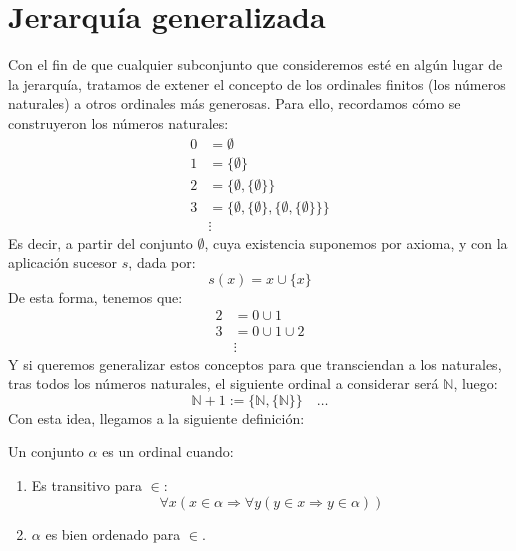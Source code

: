 \section{Jerarquía generalizada}
Con el fin de que cualquier subconjunto que consideremos esté en algún lugar de la jerarquía, tratamos de extener el concepto de los ordinales finitos (los números naturales) a otros ordinales más generosas. Para ello, recordamos cómo se construyeron los números naturales:
\begin{align*}
    0 &= \emptyset  \\
    1 &= \{\emptyset \} \\
    2 &= \{\emptyset , \{\emptyset \}\} \\
    3 &= \{\emptyset , \{\emptyset \}, \{\emptyset , \{\emptyset \}\}\} \\
      &\vdots
\end{align*}
Es decir, a partir del conjunto $\emptyset $, cuya existencia suponemos por axioma, y con la aplicación sucesor $s$, dada por:
\begin{equation*}
    s(x) = x\cup \{x\}
\end{equation*}
De esta forma, tenemos que:
\begin{align*}
    2 &= 0 \cup 1 \\
    3 &= 0 \cup 1 \cup 2 \\
      &\vdots
\end{align*}
Y si queremos generalizar estos conceptos para que transciendan a los naturales, tras todos los números naturales, el siguiente ordinal a considerar será $\mathbb{N}$, luego:
\begin{equation*}
    \mathbb{N}+1 := \{\mathbb{N}, \{\mathbb{N}\}\} \quad \ldots
\end{equation*}
Con esta idea, llegamos a la siguiente definición:

\begin{definicion}[Ordinal]
    Un conjunto $\alpha$ es un ordinal cuando:
    \begin{enumerate}
        \item Es transitivo para $\in $:
            \begin{equation*}
                \forall x(x\in \alpha \Longrightarrow \forall y(y\in x\Longrightarrow y\in \alpha))
            \end{equation*}
        \item $\alpha$ es bien ordenado para $\in $.
    \end{enumerate}
\end{definicion}

